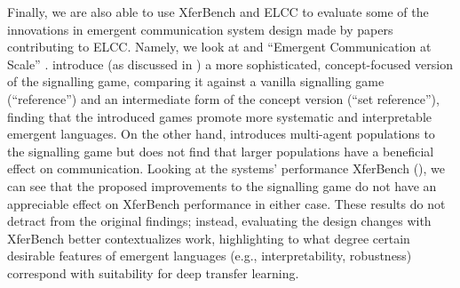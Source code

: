 Finally, we are also able to use XferBench and ELCC to evaluate some of the innovations in emergent communication system design made by papers contributing to ELCC\@.
Namely, we look at \citet{mu2021generalizations} and ``Emergent Communication at Scale'' \citep{chaabouni2022emergent}.
\citet{mu2021generalizations} introduce (as discussed in ) a more sophisticated, concept-focused version of the signalling game, comparing it against a vanilla signalling game (``reference'') and an intermediate form of the concept version (``set reference''), finding that the introduced games promote more systematic and interpretable emergent languages.
On the other hand, \citet{chaabouni2022emergent} introduces multi-agent populations to the signalling game but does not find that larger populations have a beneficial effect on communication.
Looking at the systems' performance XferBench (), we can see that the proposed improvements to the signalling game do not have an appreciable effect on XferBench performance in either case.
These results do not detract from the original findings; instead, evaluating the design changes with XferBench better contextualizes work, highlighting to what degree certain desirable features of emergent languages (e.g., interpretability, robustness) correspond with suitability for deep transfer learning.

